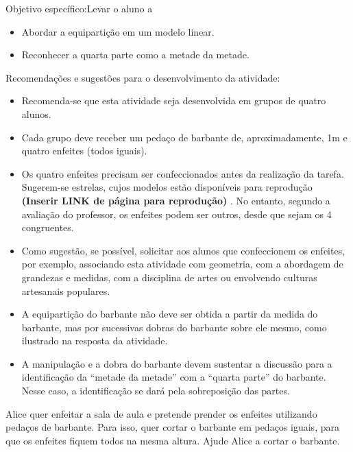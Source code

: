 \documentclass[a4paper,12pt,twoside]{book}
\begin{document}
\begin{professor*}[breakable]{}{}  
  Objetivo específico:Levar o aluno a  
\begin{itemize} %
    \item       Abordar a equipartição em um modelo linear.
    \item       Reconhecer a quarta parte como a metade da metade.
\end{itemize} %
  
  
  Recomendações e sugestões para o desenvolvimento da atividade:  
  
\begin{itemize} %
    \item       Recomenda-se que esta atividade seja desenvolvida em grupos de quatro alunos. 
    \item       Cada grupo deve receber um pedaço de barbante de, aproximadamente, 1m e quatro enfeites (todos iguais).  
    \item       Os quatro enfeites precisam ser confeccionados antes da realização da tarefa. Sugerem-se estrelas, cujos modelos estão disponíveis para reprodução       {\bf (Inserir LINK de página para reprodução)}      . No entanto, segundo a avaliação do professor, os enfeites podem ser outros, desde que sejam os 4 congruentes.
    \item       Como sugestão, se possível, solicitar aos alunos que confeccionem os enfeites, por exemplo, associando esta atividade com geometria, com a abordagem de grandezas e medidas, com a disciplina de artes ou envolvendo culturas artesanais populares.
    \item       A equipartição do barbante não deve ser obtida a partir da medida do barbante, mas por sucessivas dobras do barbante sobre ele mesmo, como ilustrado na resposta da atividade.
    \item       A manipulação e a dobra do barbante devem sustentar a discussão para a identificação da       ``metade da metade''       com a       ``quarta parte''       do barbante. Nesse caso, a identificação se dará pela sobreposição das partes. 
\end{itemize} %
  
\end{professor*}


Alice quer enfeitar a sala de aula e pretende prender os enfeites utilizando pedaços de barbante. Para isso, quer cortar o barbante em pedaços iguais, para que os enfeites fiquem todos na mesma altura. Ajude Alice a cortar o barbante.
\end{document}
